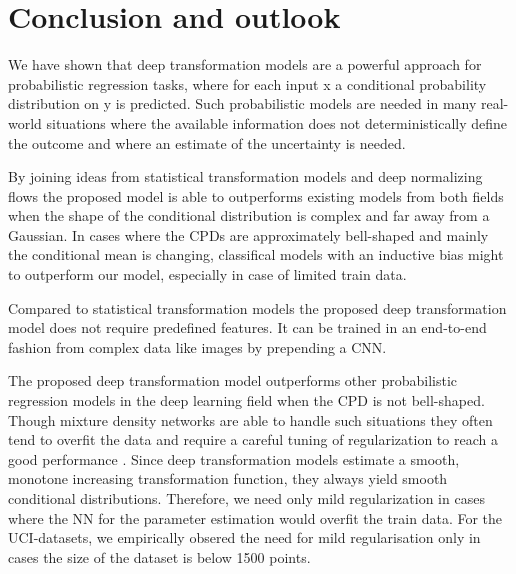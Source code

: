 \documentclass[a4paper,conference]{IEEEtran}
\begin{document}
\section{Conclusion and outlook}
We have shown that deep transformation models are a powerful approach for probabilistic regression tasks, where for each input x a conditional probability distribution on y is predicted. Such probabilistic models are needed in many real-world situations where the available information does not deterministically define the outcome and where an estimate of the uncertainty is needed.

By joining ideas from statistical transformation models and deep normalizing flows the proposed model is able to outperforms existing models from both fields when the shape of the conditional distribution is complex and far away from a Gaussian. In cases where the CPDs are approximately bell-shaped and mainly the conditional mean is changing, classifical models with an inductive bias might to outperform our model, especially in case of limited train data.

Compared to statistical transformation models the proposed deep transformation model does not require predefined features. It can be trained in an end-to-end fashion from complex data like images by prepending a CNN. 

The proposed deep transformation model outperforms other probabilistic regression models in the deep learning field when the CPD is not bell-shaped. Though mixture density networks \cite{Bishop1994} are able to handle such situations they often tend to overfit the data and require a careful tuning of regularization to reach a good performance \cite{Rothfuss}. Since deep transformation models estimate a smooth, monotone increasing transformation function, they always yield smooth conditional distributions. Therefore, we need only mild regularization in cases where the NN for the parameter estimation would overfit the train data. For the UCI-datasets, we empirically obsered the need for mild regularisation only in cases the size of the dataset is below 1500 points.
\end{document}
